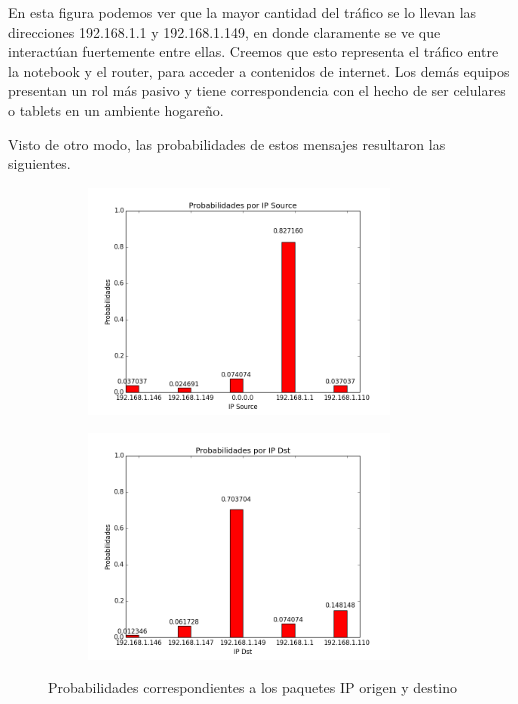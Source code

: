 En esta figura podemos ver que la mayor cantidad del tr\'afico se lo llevan las direcciones 192.168.1.1 y 192.168.1.149, en donde claramente se ve que interact\'uan fuertemente entre ellas. Creemos que esto representa el tr\'afico entre la notebook y el router, para acceder a contenidos de internet. Los dem\'as equipos presentan un rol m\'as pasivo y tiene correspondencia con el hecho de ser celulares o tablets en un ambiente hogare\~no.\newline

Visto de otro modo, las probabilidades de estos mensajes resultaron las siguientes.

\begin{figure}[H]

\begin{subfigure}{0.6\textwidth}
\includegraphics[width=0.9\linewidth, height=6cm]{imagenes/exp1/6probabilidadIPSource}
\caption{}
\end{subfigure}
\begin{subfigure}{0.6\textwidth}
\includegraphics[width=0.9\linewidth, height=6cm]{imagenes/exp1/7probabilidadIPDst}
\caption{}
\end{subfigure}

\caption{Probabilidades correspondientes a los paquetes IP origen y destino}
\label{fig:1}
\end{figure}

